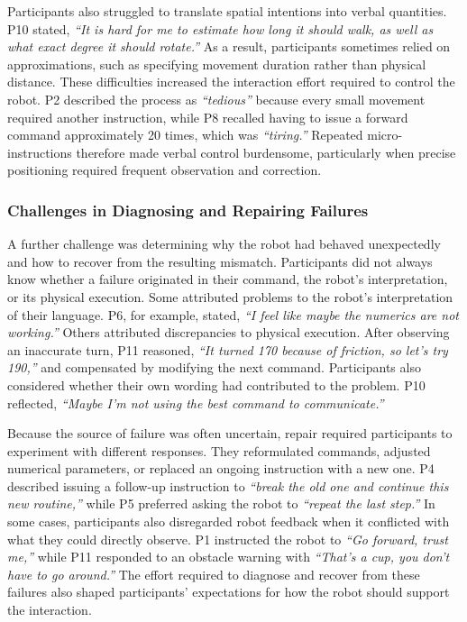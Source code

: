 Participants also struggled to translate spatial intentions into verbal quantities. P10 stated, \emph{``It is hard for me to estimate how long it should walk, as well as what exact degree it should rotate.''} As a result, participants sometimes relied on approximations, such as specifying movement duration rather than physical distance. These difficulties increased the interaction effort required to control the robot. P2 described the process as \emph{``tedious''} because every small movement required another instruction, while P8 recalled having to issue a forward command approximately 20 times, which was \emph{``tiring.''} Repeated micro-instructions therefore made verbal control burdensome, particularly when precise positioning required frequent observation and correction.

\subsubsection{Challenges in Diagnosing and Repairing Failures}
A further challenge was determining why the robot had behaved unexpectedly and how to recover from the resulting mismatch. Participants did not always know whether a failure originated in their command, the robot's interpretation, or its physical execution. Some attributed problems to the robot's interpretation of their language. P6, for example, stated, \emph{``I feel like maybe the numerics are not working.''} Others attributed discrepancies to physical execution. After observing an inaccurate turn, P11 reasoned, \emph{``It turned 170 because of friction, so let's try 190,''} and compensated by modifying the next command. Participants also considered whether their own wording had contributed to the problem. P10 reflected, \emph{``Maybe I'm not using the best command to communicate.''}

Because the source of failure was often uncertain, repair required participants to experiment with different responses. They reformulated commands, adjusted numerical parameters, or replaced an ongoing instruction with a new one. P4 described issuing a follow-up instruction to \emph{``break the old one and continue this new routine,''} while P5 preferred asking the robot to \emph{``repeat the last step.''} In some cases, participants also disregarded robot feedback when it conflicted with what they could directly observe. P1 instructed the robot to \emph{``Go forward, trust me,''} while P11 responded to an obstacle warning with \emph{``That's a cup, you don't have to go around.''} The effort required to diagnose and recover from these failures also shaped participants' expectations for how the robot should support the interaction.

